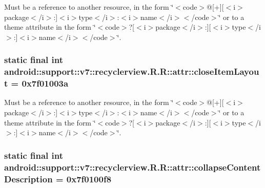 Must be a reference to another resource, in the form \char`\"{}$<$code$>$@\mbox{[}+\mbox{]}\mbox{[}$<$i$>$package$<$/i$>$:\mbox{]}$<$i$>$type$<$/i$>$:$<$i$>$name$<$/i$>$$<$/code$>$\char`\"{} or to a theme attribute in the form \char`\"{}$<$code$>$?\mbox{[}$<$i$>$package$<$/i$>$:\mbox{]}\mbox{[}$<$i$>$type$<$/i$>$:\mbox{]}$<$i$>$name$<$/i$>$$<$/code$>$\char`\"{}. \hypertarget{classandroid_1_1support_1_1v7_1_1recyclerview_1_1_r_1_1attr_dd5dce652188aa8ebba671625aab04fa}{
\subsubsection[{closeItemLayout}]{\setlength{\rightskip}{0pt plus 5cm}static final int android::support::v7::recyclerview.R.R::attr::closeItemLayout = 0x7f01003a}}
\label{classandroid_1_1support_1_1v7_1_1recyclerview_1_1_r_1_1attr_dd5dce652188aa8ebba671625aab04fa}


Must be a reference to another resource, in the form \char`\"{}$<$code$>$@\mbox{[}+\mbox{]}\mbox{[}$<$i$>$package$<$/i$>$:\mbox{]}$<$i$>$type$<$/i$>$:$<$i$>$name$<$/i$>$$<$/code$>$\char`\"{} or to a theme attribute in the form \char`\"{}$<$code$>$?\mbox{[}$<$i$>$package$<$/i$>$:\mbox{]}\mbox{[}$<$i$>$type$<$/i$>$:\mbox{]}$<$i$>$name$<$/i$>$$<$/code$>$\char`\"{}. \hypertarget{classandroid_1_1support_1_1v7_1_1recyclerview_1_1_r_1_1attr_fb62cb84e6bef1194b1343ca63aedb64}{
\subsubsection[{collapseContentDescription}]{\setlength{\rightskip}{0pt plus 5cm}static final int android::support::v7::recyclerview.R.R::attr::collapseContentDescription = 0x7f0100f8}}
\label{classandroid_1_1support_1_1v7_1_1recyclerview_1_1_r_1_1attr_fb62cb84e6bef1194b1343ca63aedb64}


